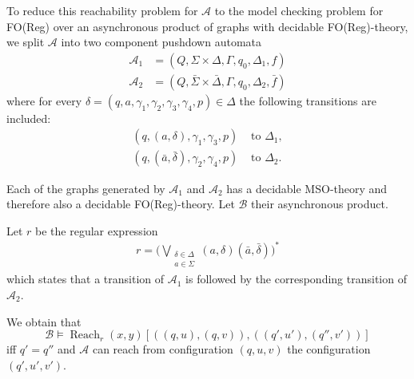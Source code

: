 \documentclass{LMCS}
\DeclareMathOperator{\Reach}{Reach}
\begin{document}
To reduce this reachability problem for $\mathcal A$ to the 
model checking problem for FO(Reg) 
over an asynchronous product of graphs with decidable FO(Reg)-theory, 
 we split $\mathcal A$ into two component pushdown automata 
\begin{align*}
 \mathcal A_1 &= (Q, \Sigma \times \Delta, \Gamma, q_0, \Delta_1, f) \\
 \mathcal A_2 &= (Q, \bar \Sigma \times \bar \Delta, \Gamma, q_0, \Delta_2, \bar f) 
\end{align*}
where for every $\delta=(q,a,\gamma_1,\gamma_2,\gamma_3,\gamma_4,p) \in \Delta$
the following transitions are included:
\begin{align*}
 (q,(a,\delta),\gamma_1, \gamma_3, p) & \text{ to } \Delta_1, \\
 (q,(\bar a,\bar \delta),\gamma_2, \gamma_4, p) & \text{ to } \Delta_2.
\end{align*}

Each of the graphs generated by $\mathcal A_1$ and $\mathcal A_2$ has a decidable 
MSO-theory 
and therefore also a decidable FO(Reg)-theory. 
Let $\mathcal B$ their asynchronous product. 

Let $r$ be the regular expression 
\begin{align*}
r=\Big(\bigvee_{\substack{\delta \in \Delta \\ a \in \Sigma}} (a,\delta)(\bar a,\bar \delta)\Big)^*
\end{align*}
which states that a transition of $\mathcal A_1$ is followed by the corresponding transition of $\mathcal A_2$.

We obtain that
\[\mathcal B \models \Reach_r(x,y)[((q,u),(q,v)),((q',u'),(q'',v'))]\]
iff $q'=q''$ and $\mathcal A$ can reach from configuration $(q,u,v)$ the configuration $(q',u',v')$.
\end{document}
